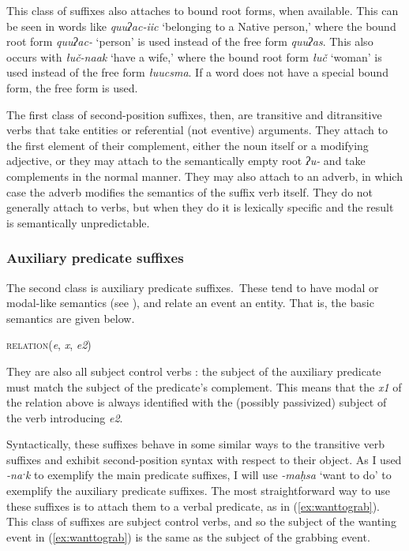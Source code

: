 This class of suffixes also attaches to bound root forms, when available. This can be seen in words like \textit{quuʔac-iic} `belonging to a Native person,' where the bound root form \textit{quuʔac-} `person' is used instead of the free form \textit{quuʔas}. This also occurs with \textit{łuč-naak} `have a wife,' where the bound root form \textit{łuč} `woman' is used instead of the free form \textit{łuucsma}. If a word does not have a special bound form, the free form is used.

The first class of second-position suffixes, then, are transitive and ditransitive verbs that take entities or referential (not eventive) arguments. They attach to the first element of their complement, either the noun itself or a modifying adjective, or they may attach to the semantically empty root \textit{ʔu-} and take complements in the normal manner. They may also attach to an adverb, in which case the adverb modifies the semantics of the suffix verb itself. They do not generally attach to verbs, but when they do it is lexically specific and the result is semantically unpredictable.

\subsubsection{Auxiliary predicate suffixes} \label{ch:clause:2pv:auxiliary}

The second class is auxiliary predicate suffixes. These tend to have modal or modal-like semantics (see \citealt[p.~29--30,71--77]{waldie2012}), and relate an event an entity. That is, the basic semantics are given below.

\ex
\textsc{relation}(\textit{e}, \textit{x}, \textit{e2})
\xe

\noindent They are also all subject control verbs \citep[p.\ 160]{wojdak2005}: the subject of the auxiliary predicate must match the subject of the predicate's complement. This means that the \textit{x1} of the relation above is always identified with the (possibly passivized) subject of the verb introducing \textit{e2}.

Syntactically, these suffixes behave in some similar ways to the transitive verb suffixes and exhibit second-position syntax with respect to their object. As I used \textit{-naˑk} to exemplify the main predicate suffixes, I will use \textit{-maḥsa} `want to do' to exemplify the auxiliary predicate suffixes. The most straightforward way to use these suffixes is to attach them to a verbal predicate, as in (\ref{ex:wanttograb}). This class of suffixes are subject control verbs, and so the subject of the wanting event in (\ref{ex:wanttograb}) is the same as the subject of the grabbing event.


